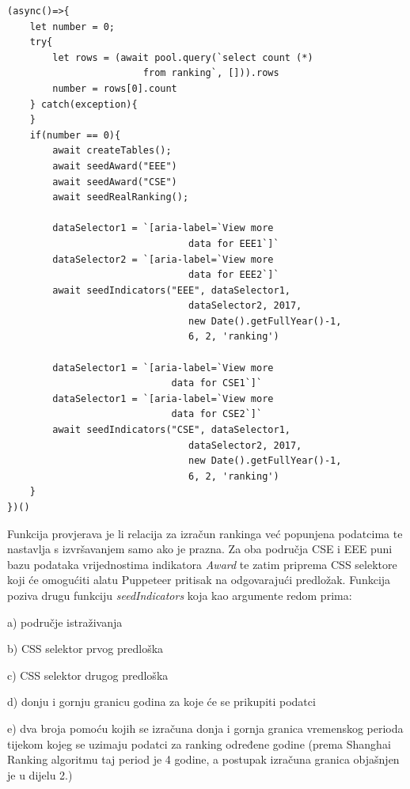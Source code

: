 \documentclass[times, utf8, zavrsni]{fer}
\begin{document}
\begin{verbatim}  
(async()=>{
    let number = 0;
    try{
        let rows = (await pool.query(`select count (*) 
                        from ranking`, [])).rows
        number = rows[0].count
    } catch(exception){
    }
    if(number == 0){
        await createTables();
        await seedAward("EEE")
        await seedAward("CSE")
        await seedRealRanking();
            
        dataSelector1 = `[aria-label=`View more 
                                data for EEE1`]`
        dataSelector2 = `[aria-label=`View more 
                                data for EEE2`]`
        await seedIndicators("EEE", dataSelector1, 
                                dataSelector2, 2017, 
                                new Date().getFullYear()-1, 
                                6, 2, 'ranking')
    
        dataSelector1 = `[aria-label=`View more
                             data for CSE1`]`
        dataSelector1 = `[aria-label=`View more
                             data for CSE2`]`
        await seedIndicators("CSE", dataSelector1, 
                                dataSelector2, 2017, 
                                new Date().getFullYear()-1,
                                6, 2, 'ranking')
    }
})()
\end{verbatim}    
Funkcija provjerava je li relacija za izračun rankinga već popunjena podatcima te \\nastavlja s izvršavanjem samo ako je prazna. 
Za oba područja CSE i EEE puni bazu podataka vrijednostima indikatora \emph{Award} te zatim priprema CSS selektore koji će omogućiti alatu 
Puppeteer pritisak na odgovarajući predložak. Funkcija poziva drugu funkciju \emph{seedIndicators} koja kao argumente redom prima:

    a) područje istraživanja
    
    b) CSS selektor prvog predloška 

    c) CSS selektor drugog predloška
    
    d) donju i gornju granicu godina za koje će se prikupiti podatci
    
    e) dva broja pomoću kojih se izračuna donja i gornja granica vremenskog perioda tijekom kojeg se uzimaju podatci za ranking određene godine
        (prema Shanghai \\Ranking algoritmu taj period je 4 godine, a postupak izračuna granica objašnjen je u dijelu 2.)
      
\end{document}
